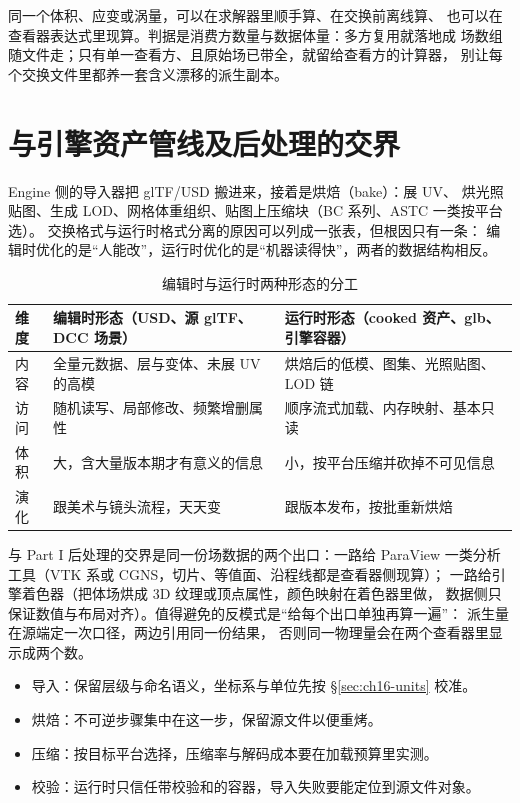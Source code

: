 \documentclass[12pt,a4paper,fontset=fandol]{ctexbook}
\newcommand{\Lang}[1]{\textsf{#1}}
\newcommand{\DomEngine}{\Lang{Engine}}
\begin{document}
\begin{note}[title={派生量放在哪一边算}]
同一个体积、应变或涡量，可以在求解器里顺手算、在交换前离线算、
也可以在查看器表达式里现算。判据是消费方数量与数据体量：多方复用就落地成
场数组随文件走；只有单一查看方、且原始场已带全，就留给查看方的计算器，
别让每个交换文件里都养一套含义漂移的派生副本。
\end{note}

\section{与引擎资产管线及后处理的交界}
\label{sec:ch16-pipeline}

\DomEngine{} 侧的导入器把 glTF/USD 搬进来，接着是烘焙（bake）：展 UV、
烘光照贴图、生成 LOD、网格体重组织、贴图上压缩块（BC 系列、ASTC 一类按平台选）。
交换格式与运行时格式分离的原因可以列成一张表，但根因只有一条：
编辑时优化的是``人能改''，运行时优化的是``机器读得快''，两者的数据结构相反。

\begin{table}[htbp]
\centering
\caption{编辑时与运行时两种形态的分工}
\label{tab:ch16-pipeline}
\begin{tabular}{>{\raggedright\arraybackslash}p{} >{\raggedright\arraybackslash}p{} >{\raggedright\arraybackslash}p{}}
\toprule
维度 & 编辑时形态（USD、源 glTF、DCC 场景） & 运行时形态（cooked 资产、glb、引擎容器） \\
\midrule
内容 & 全量元数据、层与变体、未展 UV 的高模 & 烘焙后的低模、图集、光照贴图、LOD 链 \\
访问 & 随机读写、局部修改、频繁增删属性 & 顺序流式加载、内存映射、基本只读 \\
体积 & 大，含大量版本期才有意义的信息 & 小，按平台压缩并砍掉不可见信息 \\
演化 & 跟美术与镜头流程，天天变 & 跟版本发布，按批重新烘焙 \\
\bottomrule
\end{tabular}
\end{table}

与 Part I 后处理的交界是同一份场数据的两个出口：一路给 ParaView
一类分析工具（VTK 系或 CGNS，切片、等值面、沿程线都是查看器侧现算）；
一路给引擎着色器（把体场烘成 3D 纹理或顶点属性，颜色映射在着色器里做，
数据侧只保证数值与布局对齐）。值得避免的反模式是``给每个出口单独再算一遍''：
派生量在源端定一次口径，两边引用同一份结果，
否则同一物理量会在两个查看器里显示成两个数。

\begin{compare}[title={交换格式与运行时格式的四步转换检查单}]
\begin{itemize}
  \item 导入：保留层级与命名语义，坐标系与单位先按 \S\ref{sec:ch16-units} 校准。
  \item 烘焙：不可逆步骤集中在这一步，保留源文件以便重烤。
  \item 压缩：按目标平台选择，压缩率与解码成本要在加载预算里实测。
  \item 校验：运行时只信任带校验和的容器，导入失败要能定位到源文件对象。
\end{itemize}
\end{compare}
\end{document}
